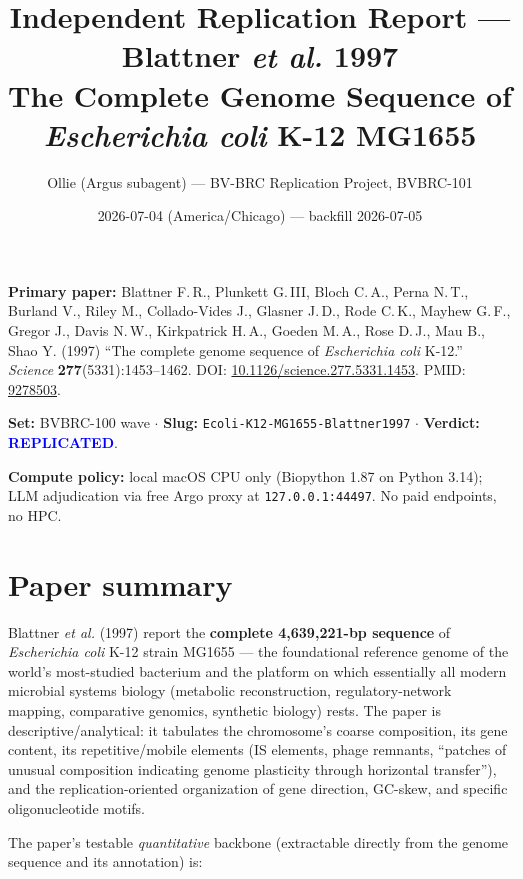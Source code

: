 \documentclass[11pt,letterpaper]{article}
\title{Independent Replication Report --- Blattner \emph{et al.} 1997 \\
       \large The Complete Genome Sequence of \emph{Escherichia coli} K-12 MG1655}
\author{Ollie (Argus subagent) --- BV-BRC Replication Project, BVBRC-101}
\date{2026-07-04 (America/Chicago) --- backfill 2026-07-05}
\begin{document}
\maketitle

\vspace{-1.2em}
\noindent\textbf{Primary paper:}
Blattner F.\,R., Plunkett G.\,III, Bloch C.\,A., Perna N.\,T., Burland V., Riley M.,
Collado-Vides J., Glasner J.\,D., Rode C.\,K., Mayhew G.\,F., Gregor J., Davis N.\,W.,
Kirkpatrick H.\,A., Goeden M.\,A., Rose D.\,J., Mau B., Shao Y. (1997)
``The complete genome sequence of \emph{Escherichia coli} K-12.''
\emph{Science} \textbf{277}(5331):1453--1462.
DOI: \href{https://doi.org/10.1126/science.277.5331.1453}{10.1126/science.277.5331.1453}.
PMID: \href{https://pubmed.ncbi.nlm.nih.gov/9278503/}{9278503}.

\vspace{0.5em}
\noindent\textbf{Set:} BVBRC-100 wave $\cdot$ \textbf{Slug:} \texttt{Ecoli-K12-MG1655-Blattner1997} $\cdot$
\textbf{Verdict:} \textcolor{blue}{\textbf{REPLICATED}}.

\vspace{0.5em}
\noindent\textbf{Compute policy:} local macOS CPU only (Biopython 1.87 on Python 3.14);
LLM adjudication via free Argo proxy at \texttt{127.0.0.1:44497}. No paid endpoints, no HPC.

\hrulefill

\section{Paper summary}

Blattner \emph{et al.} (1997) report the \textbf{complete 4{,}639{,}221-bp sequence} of
\emph{Escherichia coli} K-12 strain MG1655 --- the foundational reference genome of the world's
most-studied bacterium and the platform on which essentially all modern microbial systems biology
(metabolic reconstruction, regulatory-network mapping, comparative genomics, synthetic biology) rests.
The paper is descriptive/analytical: it tabulates the chromosome's coarse composition, its gene
content, its repetitive/mobile elements (IS elements, phage remnants, ``patches of unusual
composition indicating genome plasticity through horizontal transfer''), and the replication-oriented
organization of gene direction, GC-skew, and specific oligonucleotide motifs.

The paper's testable \emph{quantitative} backbone (extractable directly from the genome sequence and
its annotation) is:
\end{document}
